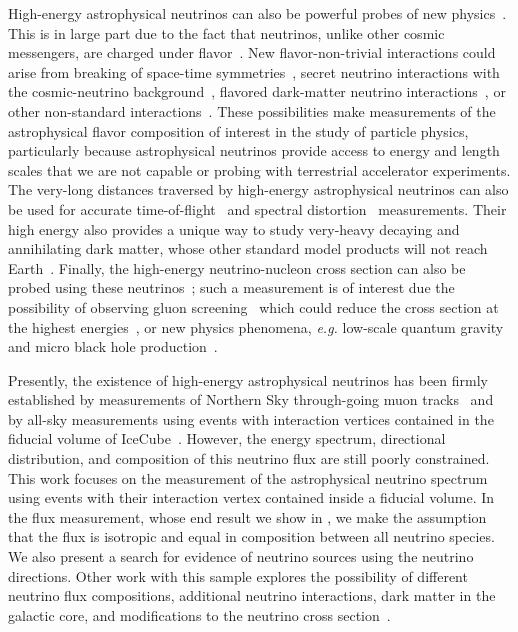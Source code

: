 High-energy astrophysical neutrinos can also be powerful probes of new physics~\cite{Ahlers:2018mkf}.
This is in large part due to the fact that neutrinos, unlike other cosmic messengers, are charged under flavor~\cite{Gaisser:1994yf,Ackermann:2019cxh,Arguelles:2019rbn}.
New flavor-non-trivial interactions could arise from breaking of space-time symmetries~\cite{Diaz:2013wia,Arguelles:2015dca}, secret neutrino interactions with the cosmic-neutrino background~\cite{Davis:2015rza,Cherry:2016jol,Arguelles:2017atb,Kelly:2018tyg}, flavored dark-matter neutrino interactions~\cite{Capozzi:2018bps,Farzan:2018pnk,Choi:2019zxy}, or other non-standard interactions~\cite{Rasmussen:2017ert}.
These possibilities make measurements of the astrophysical flavor composition of interest in the study of particle physics, particularly because astrophysical neutrinos provide access to energy and length scales that we are not capable or probing with terrestrial accelerator experiments.
The very-long distances traversed by high-energy astrophysical neutrinos can also be used for accurate time-of-flight~\cite{Ellis:2018ogq} and spectral distortion~\cite{Liao:2017yuy} measurements.
Their high energy also provides a unique way to study very-heavy decaying and annihilating dark matter, whose other standard model products will not reach Earth~\cite{Aartsen:2018mxl}.
Finally, the high-energy neutrino-nucleon cross section can also be probed using these neutrinos~\cite{Bertone:2018dse,Anchordoqui:2019ufu}; such a measurement is of interest due the possibility of observing gluon screening~\cite{Henley:2005ms} which could reduce the cross section at the highest energies~\cite{Block:2014kza,Goncalves:2015fua,Arguelles:2015wba}, or new physics phenomena, \textit{e.g.} low-scale quantum gravity~\cite{AlvarezMuniz:2001mk} and micro black hole production~\cite{AlvarezMuniz:2002ga,Mack:2019bps}.

Presently, the existence of high-energy astrophysical neutrinos has been firmly established by measurements of Northern Sky through-going muon tracks~\cite{Aartsen:2015rwa,Aartsen:2016xlq} and by all-sky measurements using events with interaction vertices contained in the fiducial volume of IceCube~\cite{Aartsen:2013jdh,Aartsen:2014gkd,Aartsen:2015zva,Aartsen:2017mau}.
However, the energy spectrum, directional distribution, and composition of this neutrino flux are still poorly constrained.
This work focuses on the measurement of the astrophysical neutrino spectrum using events with their interaction vertex contained inside a fiducial volume.
In the flux measurement, whose end result we show in , we make the assumption that the flux is isotropic and equal in composition between all neutrino species.
We also present a search for evidence of neutrino sources using the neutrino directions.
Other work with this sample explores the possibility of different neutrino flux compositions, additional neutrino interactions, dark matter in the galactic core, and modifications to the neutrino cross section~\cite{HESETAU,HESEFLV,HESEDM,HESEXS}.

